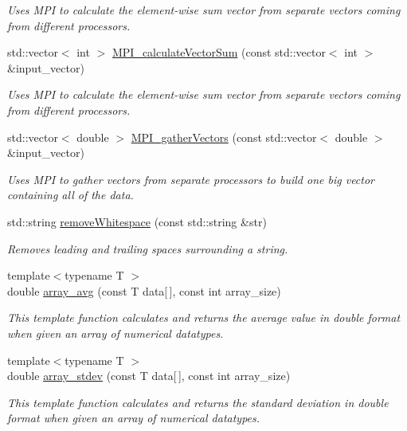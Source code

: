 \begin{DoxyCompactItemize}
\begin{DoxyCompactList}\small\item\em Uses M\+PI to calculate the element-\/wise sum vector from separate vectors coming from different processors. \end{DoxyCompactList}\item 
std\+::vector$<$ int $>$ \hyperlink{namespace_utils_ad7b634b14633046c6da126945d688aaf}{M\+P\+I\+\_\+calculate\+Vector\+Sum} (const std\+::vector$<$ int $>$ \&input\+\_\+vector)
\begin{DoxyCompactList}\small\item\em Uses M\+PI to calculate the element-\/wise sum vector from separate vectors coming from different processors. \end{DoxyCompactList}\item 
std\+::vector$<$ double $>$ \hyperlink{namespace_utils_aee439dad386e2477d34968311b166c85}{M\+P\+I\+\_\+gather\+Vectors} (const std\+::vector$<$ double $>$ \&input\+\_\+vector)
\begin{DoxyCompactList}\small\item\em Uses M\+PI to gather vectors from separate processors to build one big vector containing all of the data. \end{DoxyCompactList}\item 
std\+::string \hyperlink{namespace_utils_af9ceee3373ffe317f07d177cf0dfe056}{remove\+Whitespace} (const std\+::string \&str)
\begin{DoxyCompactList}\small\item\em Removes leading and trailing spaces surrounding a string. \end{DoxyCompactList}\item 
{\footnotesize template$<$typename T $>$ }\\double \hyperlink{namespace_utils_aa76a204af4dd4c3eb151691825de2eb2}{array\+\_\+avg} (const T data\mbox{[}$\,$\mbox{]}, const int array\+\_\+size)
\begin{DoxyCompactList}\small\item\em This template function calculates and returns the average value in double format when given an array of numerical datatypes. \end{DoxyCompactList}\item 
{\footnotesize template$<$typename T $>$ }\\double \hyperlink{namespace_utils_a25d09c704b5ae03f01cf76b6de10aa19}{array\+\_\+stdev} (const T data\mbox{[}$\,$\mbox{]}, const int array\+\_\+size)
\begin{DoxyCompactList}\small\item\em This template function calculates and returns the standard deviation in double format when given an array of numerical datatypes. \end{DoxyCompactList}\item 

\end{DoxyCompactItemize}
